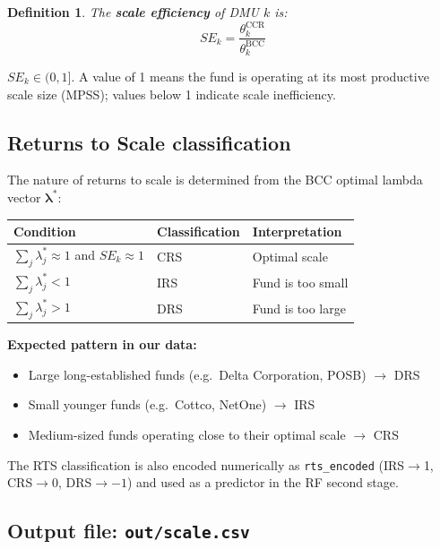 \documentclass[12pt,a4paper]{article}
\newtheorem{definition}{Definition}
\begin{document}
\begin{definition}
    The \textbf{scale efficiency} of DMU $k$ is:
    \[
        SE_k = \frac{\theta_k^{\text{CCR}}}{\theta_k^{\text{BCC}}}
    \]
\end{definition}

$SE_k \in (0, 1]$.  A value of 1 means the fund is operating at its most
productive scale size (MPSS); values below 1 indicate scale inefficiency.

\subsection{Returns to Scale classification}

The nature of returns to scale is determined from the BCC optimal lambda vector
$\boldsymbol{\lambda}^*$:

\begin{table}[H]
\centering
\begin{tabular}{lll}
\toprule
\textbf{Condition} & \textbf{Classification} & \textbf{Interpretation} \\
\midrule
$\sum_j \lambda_j^* \approx 1$ and $SE_k \approx 1$ & CRS & Optimal scale \\
$\sum_j \lambda_j^* < 1$                              & IRS & Fund is too small \\
$\sum_j \lambda_j^* > 1$                              & DRS & Fund is too large \\
\bottomrule
\end{tabular}
\end{table}

\textbf{Expected pattern in our data:}
\begin{itemize}
    \item Large long-established funds (e.g.\ Delta Corporation, POSB) $\rightarrow$ DRS
    \item Small younger funds (e.g.\ Cottco, NetOne) $\rightarrow$ IRS
    \item Medium-sized funds operating close to their optimal scale $\rightarrow$ CRS
\end{itemize}

The RTS classification is also encoded numerically as \texttt{rts\_encoded}
(IRS$\to$1, CRS$\to$0, DRS$\to-1$) and used as a predictor in the RF second stage.

\subsection{Output file: \texttt{out/scale.csv}}
\end{document}
